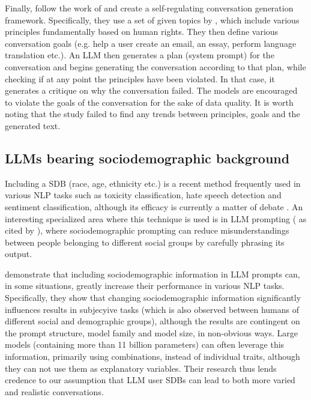 Finally, \citet{lambert2024selfdirectedsyntheticdialoguesrevisions} follow the work of \citet{Bai2022ConstitutionalAH} and create a self-regulating conversation generation framework. Specifically, they use a set of given topics by \citet{Castricato2024SuppressingPE}, which include various principles fundamentally based on human rights. They then define various conversation goals (e.g. help a user create an email, an essay, perform language translation etc.). An LLM then generates a plan (system prompt) for the conversation and begins generating the conversation according to that plan, while checking if at any point the principles have been violated. In that case, it generates a critique on why the conversation failed. The models are encouraged to violate the goals of the conversation for the sake of data quality. It is worth noting that the study failed to find any trends between principles, goals and the generated text.

\subsection{LLMs bearing sociodemographic background}
\label{sec:related:sociodemographic}

Including a \ac{SDB} (race, age, ethnicity etc.) is a recent method frequently used in various \ac{NLP} tasks such as toxicity classification, hate speech detection and sentiment classification, although its efficacy is currently a matter of debate \cite{beck-etal-2024-sensitivity}. An interesting specialized area where this technique is used is in LLM prompting (\cite{hwang-etal-2023-aligning, durmus2024measuringrepresentationsubjectiveglobal} as cited by \citet{beck-etal-2024-sensitivity}), where sociodemographic prompting can reduce misunderstandings between people belonging to different social groups by carefully phrasing its output. 

\citet{beck-etal-2024-sensitivity} demonstrate that including sociodemographic information in LLM prompts can, in some situations, greatly increase their performance in various \ac{NLP} tasks. Specifically, they show that changing sociodemographic information significantly influences results in subjecyive tasks (which is also observed between humans of different social and demographic groups), although the results are contingent on the prompt structure, model family and model size, in non-obvious ways. Large models (containing more than 11 billion parameters) can often leverage this information, primarily using combinations, instead of individual traits, although they can not use them as explanatory variables. Their research thus lends credence to our assumption that LLM user \acp{SDB} can lead to both more varied and realistic conversations. 

